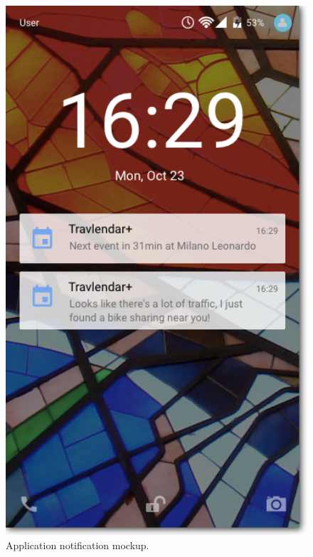 \begin{figure}
	\centering
	\includegraphics[width=4.5in]{./images/lockscreen.png}
	\caption{Application notification mockup.}
	\label{fig:MockupNotifications}
\end{figure}